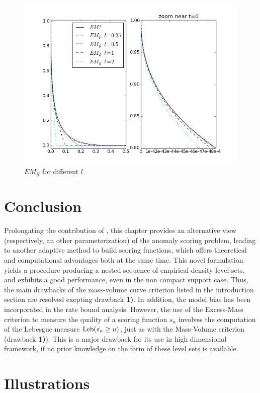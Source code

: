 \begin{figure}[!ht]
\includegraphics[width=\linewidth]{fig_source/EMG-EM.png}
\caption{$EM_\mathcal{G}$ for different $l$} %
\label{aistat:EMGEM}
\end{figure}


\section{Conclusion}
Prolongating the contribution of \cite{CLEM13}, this chapter provides an alternative view (respectively, an other parameterization) of the anomaly scoring problem, leading to another adaptive method to build scoring functions, which offers theoretical and computational advantages both at the same time. This novel formulation yields a procedure producing a nested sequence of empirical density level sets, and exhibits a good performance, even in the non compact support case. 
Thus, the main drawbacks of the mass-volume curve criterion listed in the introduction section are resolved exepting drawback \textbf{1)}. In addition, the model bias has been incorporated in the rate bound analysis.
%
However, the use of the Excess-Mass criterion to measure the quality of a scoring function $s_n$ involves the computation of the Lebesgue measure  $\text{Leb}(s_n \ge u)$, just as with the Mass-Volume criterion (drawback \textbf{1)}). This is a major drawback for its use in high dimensional framework, if no prior knowledge on the form of these level sets is available.


\section{Illustrations}

